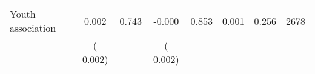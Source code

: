\begin{tabular}{l*{7}{c}}
 Youth association       &              0.002       &        0.743  &             -0.000       &        0.853  &              0.001       &              0.256 &  2678 \\ 
                       &       (       0.002)             &                               &       (       0.002)                     &                               &                                               &                                &                      \\ 

\hline \end{tabular}